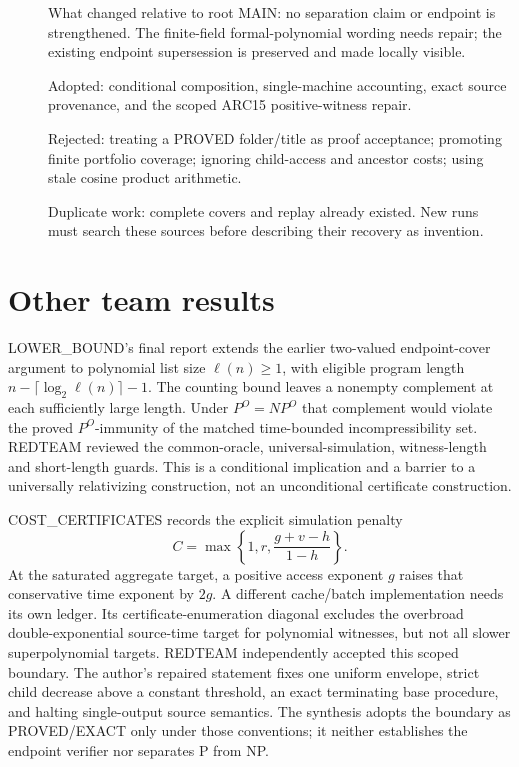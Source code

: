 \documentclass[11pt]{article}
\begin{document}
\begin{description}
\item[] What changed relative to root MAIN: no separation claim or endpoint
is strengthened. The finite-field formal-polynomial wording needs repair;
the existing endpoint supersession is preserved and made locally visible.
\item[] Adopted: conditional composition, single-machine accounting, exact
source provenance, and the scoped ARC15 positive-witness repair.
\item[] Rejected: treating a PROVED folder/title as proof acceptance;
promoting finite portfolio coverage; ignoring child-access and ancestor costs;
using stale cosine product arithmetic.
\item[] Duplicate work: complete covers and replay already existed. New
runs must search these sources before describing their recovery as invention.
\end{description}

\section*{Other team results}
LOWER\_BOUND's final report extends the earlier two-valued endpoint-cover
argument to polynomial list size $\ell(n)\ge1$, with eligible program
length $n-\lceil\log_2\ell(n)\rceil-1$. The counting bound leaves a
nonempty complement at each sufficiently large length. Under $P^O=NP^O$
that complement would violate the proved $P^O$-immunity of the matched
time-bounded incompressibility set. REDTEAM reviewed the common-oracle,
universal-simulation, witness-length and short-length guards. This is a
conditional implication and a barrier to a universally relativizing
construction, not an unconditional certificate construction.

COST\_CERTIFICATES records the explicit simulation penalty
\[
 C=\max\left\{1,r,\frac{g+v-h}{1-h}\right\}.
\]
At the saturated aggregate target, a positive access exponent $g$ raises
that conservative time exponent by $2g$. A different cache/batch
implementation needs its own ledger. Its certificate-enumeration diagonal
excludes the overbroad double-exponential source-time target for polynomial
witnesses, but not all slower superpolynomial targets. REDTEAM independently
accepted this scoped boundary. The author's repaired statement fixes one
uniform envelope, strict child decrease above a constant threshold, an exact
terminating base procedure, and halting single-output source semantics.
The synthesis adopts the boundary as PROVED/EXACT only under those conventions;
it neither establishes the endpoint verifier nor separates P from NP.
\end{document}

